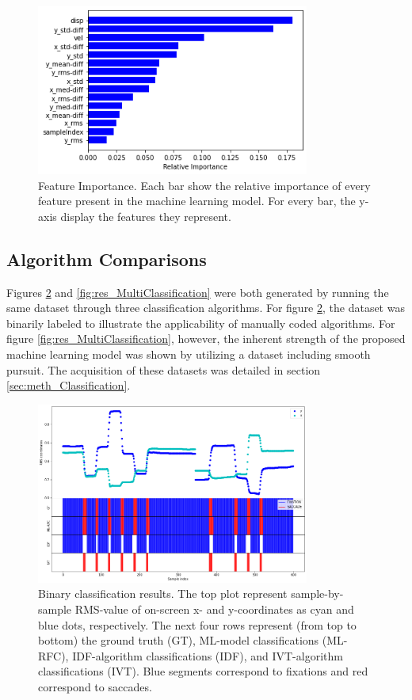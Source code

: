 \begin{figure}[h]
    \centering
    \includegraphics[width=0.8\textwidth]{Images/Classification/FeatureImportance.png}
    \caption{Feature Importance. Each bar show the relative importance of every feature present in the machine learning model. For every bar, the y-axis display the features they represent.}
    \label{fig:res_FeatureImportance}
\end{figure}

\subsection{Algorithm Comparisons}
    
Figures \ref{fig:res_BinaryClassification} and \ref{fig:res_MultiClassification} were both generated by running the same dataset through three classification algorithms. For figure \ref{fig:res_BinaryClassification}, the dataset was binarily labeled to illustrate the applicability of manually coded algorithms. For figure \ref{fig:res_MultiClassification}, however, the inherent strength of the proposed machine learning model was shown by utilizing a dataset including smooth pursuit. The acquisition of these datasets was detailed in section \ref{sec:meth_Classification}. 

\begin{figure}[h]
    \centering
    \includegraphics[width=0.8\textwidth]{Images/Classification/BinaryClassification.png}
    \caption{Binary classification results. The top plot represent sample-by-sample RMS-value of on-screen x- and y-coordinates as cyan and blue dots, respectively. The next four rows represent (from top to bottom) the ground truth (GT), ML-model classifications (ML-RFC), IDF-algorithm classifications (IDF), and IVT-algorithm classifications (IVT). Blue segments correspond to fixations and red correspond to saccades.}
    \label{fig:res_BinaryClassification}
\end{figure}

